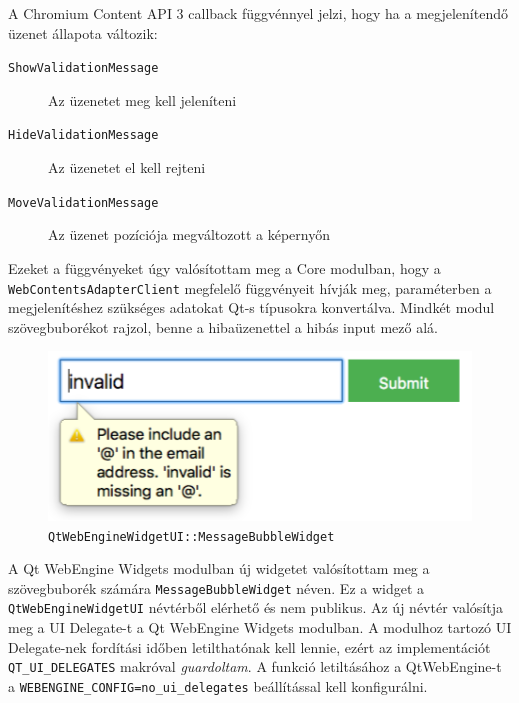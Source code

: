 \documentclass[12pt]{report}
\begin{document}
A Chromium Content API 3 callback függvénnyel jelzi, hogy ha a megjelenítendő üzenet állapota
változik:
\begin{description}
    \item[\texttt{ShowValidationMessage}] Az üzenetet meg kell jeleníteni
    \item[\texttt{HideValidationMessage}] Az üzenetet el kell rejteni
    \item[\texttt{MoveValidationMessage}] Az üzenet pozíciója megváltozott a képernyőn
\end{description}
Ezeket a függvényeket úgy valósítottam meg a Core modulban, hogy a
\texttt{WebContentsAdapterClient} megfelelő függvényeit hívják meg, paraméterben
a megjelenítéshez szükséges adatokat Qt-s típusokra konvertálva. Mindkét modul
szövegbuborékot rajzol, benne a hibaüzenettel a hibás input mező alá.

\begin{figure}[h]
    \centering
    \includegraphics[scale=0.7]{bubi-widget-screenshot}
    \caption{
        \label{fig:bubi-widget-screenshot}
        \texttt{QtWebEngineWidgetUI::MessageBubbleWidget}
    }
\end{figure}

A Qt WebEngine Widgets modulban új widgetet valósítottam meg a szövegbuborék számára
\texttt{MessageBubbleWidget} néven. Ez a widget a \texttt{QtWebEngineWidgetUI} névtérből
elérhető és nem publikus. Az új névtér valósítja meg a UI Delegate-t a Qt WebEngine Widgets
modulban. A modulhoz tartozó UI Delegate-nek fordítási időben letilthatónak kell lennie,
ezért az implementációt \texttt{QT\_UI\_DELEGATES} makróval \textit{guardoltam}. A funkció
letiltásához a QtWebEngine-t a \texttt{WEBENGINE\_CONFIG=no\_ui\_delegates} beállítással kell
konfigurálni.
\end{document}
